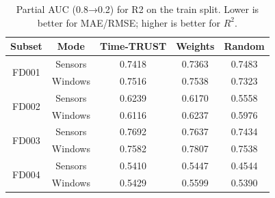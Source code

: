 \begin{table}[t]
\centering
\caption{Partial AUC (0.8→0.2) for R2 on the train split. Lower is better for MAE/RMSE; higher is better for $R^2$.}
\label{tab:auc_r2_train}
\begin{tabular}{|c|c|c|c|c|}
\hline
Subset & Mode & Time-TRUST & Weights & Random \\
\hline
\multirow{2}{*}{FD001} & Sensors & 0.7418 & 0.7363 & 0.7483 \\
 & Windows & 0.7516 & 0.7538 & 0.7323 \\
\hline
\multirow{2}{*}{FD002} & Sensors & 0.6239 & 0.6170 & 0.5558 \\
 & Windows & 0.6116 & 0.6237 & 0.5976 \\
\hline
\multirow{2}{*}{FD003} & Sensors & 0.7692 & 0.7637 & 0.7434 \\
 & Windows & 0.7582 & 0.7807 & 0.7538 \\
\hline
\multirow{2}{*}{FD004} & Sensors & 0.5410 & 0.5447 & 0.4544 \\
 & Windows & 0.5429 & 0.5599 & 0.5390 \\
\hline
\end{tabular}
\end{table}
